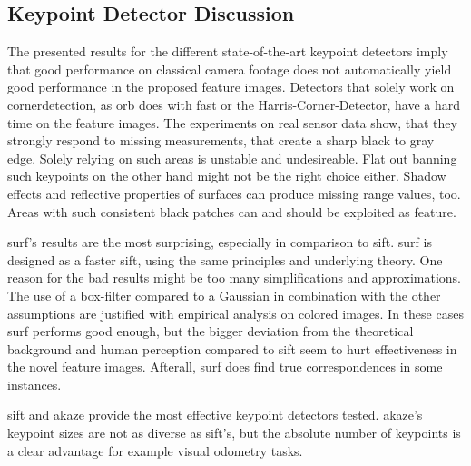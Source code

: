 \subsection{Keypoint Detector Discussion}

The presented results for the different state-of-the-art keypoint detectors imply that good performance on classical camera footage does not automatically yield good performance in the proposed feature images.
Detectors that solely work on cornerdetection, as \acrshort{orb} does with \acrshort{fast} or the Harris-Corner-Detector, have a hard time on the feature images.
The experiments on real sensor data show, that they strongly respond to missing measurements, that create a sharp black to gray edge.
Solely relying on such areas is unstable and undesireable.
Flat out banning such keypoints on the other hand might not be the right choice either.
Shadow effects and reflective properties of surfaces can produce missing range values, too.
Areas with such consistent black patches can and should be exploited as feature.

\acrshort{surf}'s results are the most surprising, especially in comparison to \acrshort{sift}.
\acrshort{surf} is designed as a faster \acrshort{sift}, using the same principles and underlying theory.
One reason for the bad results might be too many simplifications and approximations.
The use of a box-filter compared to a Gaussian in combination with the other assumptions are justified with empirical analysis on colored images.
In these cases \acrshort{surf} performs good enough, but the bigger deviation from the theoretical background and human perception compared to \acrshort{sift} seem to hurt effectiveness in the novel feature images.
Afterall, \acrshort{surf} does find true correspondences in some instances.

\acrshort{sift} and \acrshort{akaze} provide the most effective keypoint detectors tested.
\acrshort{akaze}'s keypoint sizes are not as diverse as \acrshort{sift}'s, but the absolute number of keypoints is a clear advantage for example visual odometry tasks.
